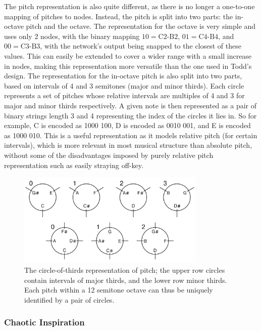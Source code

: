\documentclass[ author={Stephen Livermore-Tozer},
				supervisor={Dr. Peter Flach},
				degree={MEng},
				title={Algorithmic Co-composition Using Machine Learning},
				subtitle={},
				type={research},
				year={2016} ]{dissertation}
\begin{document}
	The pitch representation is also quite different, as there is no longer a one-to-one mapping of pitches to nodes. Instead, the pitch is split into two parts: the in-octave pitch and the octave. The representation for the octave is very simple and uses only 2 nodes, with the binary mapping $10 = \text{C2-B2}$, $01 = \text{C4-B4}$, and $00 = \text{C3-B3}$, with the network's output being snapped to the closest of these values. This can easily be extended to cover a wider range with a small increase in nodes, making this representation more versatile than the one used in Todd's design. The representation for the in-octave pitch is also split into two parts, based on intervals of 4 and 3 semitones (major and minor thirds). Each circle represents a set of pitches whose relative intervals are multiples of 4 and 3 for major and minor thirds respectively. A given note is then represented as a pair of binary strings length 3 and 4 representing the index of the circles it lies in. So for example, C is encoded as 1000 100, D is encoded as 0010 001, and E is encoded as 1000 010. This is a useful representation as it models relative pitch (for certain intervals), which is more relevant in most musical structure than absolute pitch, without some of the disadvantages imposed by purely relative pitch representation such as easily straying off-key. 
	
	\begin{figure}[h]
		\centering
		\includegraphics[width=0.8\textwidth]{circles-of-thirds}
		\caption{The circle-of-thirds representation of pitch; the upper row circles contain intervals of major thirds, and the lower row minor thirds. Each pitch within a 12 semitone octave can thus be uniquely identified by a pair of circles.}
	\end{figure}
	
	\subsubsection{Chaotic Inspiration}
	\label{sec:chaotic-inspiration}
	
\end{document}
